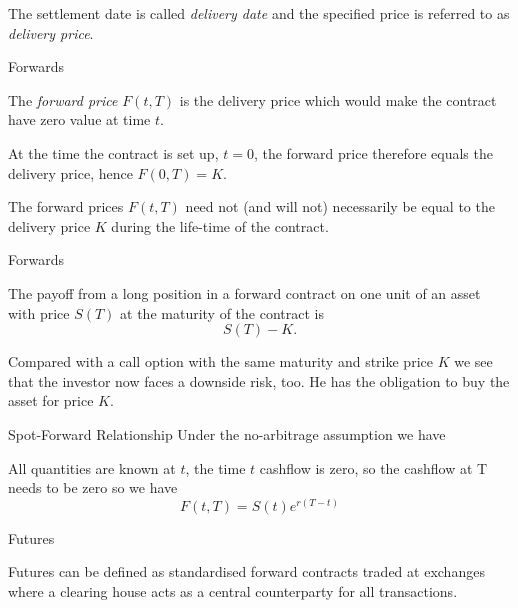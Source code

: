	The settlement
date is called {\it delivery date} and the specified price is
referred to as {\it delivery price}.


{Forwards}


	The {\it forward
price} $F(t,T)$ is the delivery price which would make the
contract have zero value at time $t$.

	At the time the contract is set up, $t=0$,
the forward price therefore equals the delivery price, hence
$F(0,T) = K$.

	The forward prices $F(t,T)$ need not (and will not)
necessarily be equal to the delivery price $K$ during the
life-time of the contract.


{Forwards}


	The payoff from a long position in a forward contract on one unit
of an asset with price $S(T)$ at the maturity of the contract is
$$ S(T)-K.$$

	Compared with a call option with the same maturity
and strike price $K$ we see that the investor now faces a downside
risk, too. He has the obligation to buy the asset for price $K$.


{Spot-Forward Relationship}
Under the no-arbitrage assumption we have

\begin{center}
\end{center}

All quantities are known at $t$, the time $t$ cashflow is zero, so the cashflow at T needs to be zero so we have $$F(t,T) = S(t)e^{r(T-t)}$$

{Futures}


	Futures can be defined as standardised forward contracts traded at exchanges where a clearing house acts as a central counterparty for all transactions.

